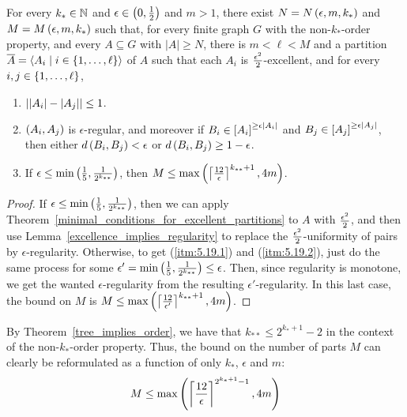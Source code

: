     \theorem[Theorem 5.19]\label{existance_of_regular_partitions}
        For every $k_* \in \mathbb{N}$ and $\epsilon \in \left( 0, {1 \over 2} \right)$ and $m > 1$, there exist $N = N\left( \epsilon, m, k_* \right)$
        and $M = M\left( \epsilon, m, k_* \right)$ such that, for every finite graph $G$ with the non-$k_{*}$-order property,
        and every $A \subseteq G$ with $|A| \geq N$, there is $m < \ell < M$ and a partition
        $\overline{A} = \left< A_i \mid i \in \left\{ 1, \dots, \ell \right\} \right>$ of $A$ such that each $A_i$ is
        ${{\epsilon^2} \over 2}$-excellent, and for every $i, j \in \left\{ 1, \dots, \ell \right\}$,
        \begin{enumerate}
            \item \label{itm:5.19.1} $\left| \left| A_i \right|- \left| A_j \right| \right| \leq 1$.
            \item \label{itm:5.19.2} $\left( A_i, A_j \right)$ is $\epsilon$-regular, and moreover if
                $B_i \in \left[ A_i \right]^{\geq \epsilon \left| A_i \right|}$ and $B_j \in \left[ A_j \right]^{\geq \epsilon \left| A_j \right|}$,
                then either $d\left( B_i, B_j \right) < \epsilon$ or $d\left( B_i, B_j \right) \geq 1 - \epsilon$.
            \item \label{itm:5.19.3} If $\epsilon \leq \min \left( \frac{1}{5}, \frac{1}{2^{k_{**}}} \right)$, then
                $M \leq \max \left( \left\lceil \frac{12}{\epsilon} \right\rceil^{k_{**}+1}, 4m \right)$.
        \end{enumerate}
        \begin{proof}
            If $\epsilon \leq \min \left( \frac{1}{5}, \frac{1}{2^{k_{**}}} \right)$, then we can apply Theorem~\ref{minimal_conditions_for_excellent_partitions}
            to $A$ with ${{\epsilon^2} \over 2}$, and then use Lemma~\ref{excellence_implies_regularity} to replace the
            ${{\epsilon^2} \over 2}$-uniformity of pairs by $\epsilon$-regularity.
            Otherwise, to get (\ref{itm:5.19.1}) and (\ref{itm:5.19.2}), just do the same process for some
            $\epsilon' = \min \left( \frac{1}{5}, \frac{1}{2^{k_{**}}} \right) \leq \epsilon$.
            Then, since regularity is monotone, we get the wanted $\epsilon$-regularity from the resulting $\epsilon'$-regularity.
            In this last case, the bound on $M$ is $M \leq \max \left( \left\lceil \frac{12}{\epsilon'} \right\rceil^{k_{**}+1}, 4m \right)$.
        \end{proof}

    \begin{remark}
        By Theorem~\ref{tree_implies_order}, we have that $k_{**} \leq 2^{k_* + 1}-2$ in the context of the non-$k_*$-order
        property.
        Thus, the bound on the number of parts $M$ can clearly be reformulated as a function of only $k_*$, $\epsilon$ and $m$:
        \[
            M \leq \max \left( \left\lceil \frac{12}{\epsilon} \right\rceil^{2^{k_* + 1}-1}, 4m \right)
        \]
    \end{remark}




